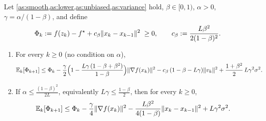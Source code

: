 \begin{tcolorbox}[keybox]
\begin{theorem}\label{thm:master}
Let \cref{as:smooth,as:lower,as:unbiased,as:variance} hold, $\beta\in[0,1)$, $\alpha>0$,
$\gamma=\alpha/(1-\beta)$, and define
\begin{equation}\label{eq:potential}
  \Phi_k:=f(z_k)-f^\star+c_\beta\lVert x_k-x_{k-1}\rVert^2\;\ge0,\qquad c_\beta:=\frac{L\beta^2}{2(1-\beta)^2}.
\end{equation}
\begin{enumerate}[label=\textup{(\alph*)}]
\item For every $k\ge0$ (no condition on $\alpha$),
\begin{equation}\label{eq:master-general}
  \mathbb{E}_k[\Phi_{k+1}]\le\Phi_k
  -\frac\gamma2\Bigl(1-\frac{L\gamma\,(1-\beta+\beta^2)}{1-\beta}\Bigr)\lVert \nabla f(x_k)\rVert^2
  -c_\beta\,(1-\beta-L\gamma)\lVert v_k\rVert^2
  +\frac{1+\beta^2}{2}\,L\gamma^2\sigma^2 .
\end{equation}
\item If $\alpha\le\frac{(1-\beta)^2}{2L}$, equivalently $L\gamma\le\frac{1-\beta}{2}$, then
for every $k\ge0$,
\begin{equation}\label{eq:master}
  \mathbb{E}_k[\Phi_{k+1}]\le\Phi_k-\frac\gamma4\lVert \nabla f(x_k)\rVert^2
  -\frac{L\beta^2}{4(1-\beta)}\lVert x_k-x_{k-1}\rVert^2+L\gamma^2\sigma^2 .
\end{equation}
\end{enumerate}
\end{theorem}
\end{tcolorbox}

